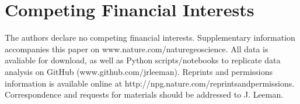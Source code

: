 \documentclass[11pt]{article}
\begin{document}
\section{Competing Financial Interests}
The authors declare no competing financial interests. Supplementary information
accompanies this paper on www.nature.com/naturegeoscience. All data is avaliable
for download, as well as Python scripts/notebooks to replicate data analysis on
GitHub (www.github.com/jrleeman). Reprints and permissions information is
available online at http://npg.nature.com/reprintsandpermissions. Correspondence
and requests for materials should be addressed to J. Leeman.  
\end{document}
